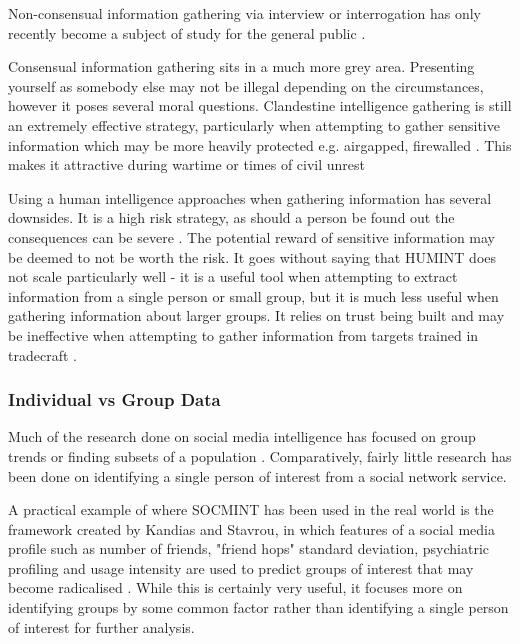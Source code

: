 \documentclass[12pt]{article}
\begin{document}
Non-consensual information gathering via interview or interrogation has only recently become a subject of study for the general public \citep{humintinterrogators}. 

Consensual information gathering sits in a much more grey area. Presenting yourself as somebody else may not be illegal depending on the circumstances, however it poses several moral questions. Clandestine intelligence gathering is still an extremely effective strategy, particularly when attempting to gather sensitive information which may be more heavily protected e.g. airgapped, firewalled \citep{clandestinehumint}. This makes it attractive during wartime or times of civil unrest \citep{humintni}\citep{humintcyberage}

Using a human intelligence approaches when gathering information has several downsides. It is a high risk strategy, as should a person be found out the consequences can be severe \citep{humintni}. The potential reward of sensitive information may be deemed to not be worth the risk. It goes without saying that HUMINT does not scale particularly well - it is a useful tool when attempting to extract information from a single person or small group, but it is much less useful when gathering information about larger groups. It relies on trust being built and may be ineffective when attempting to gather information from targets trained in tradecraft \citep{humintni}\citep{clandestinehumint}\citep{humintcyberage}.

\subsubsection{Individual vs Group Data}
Much of the research done on social media intelligence has focused on group trends or finding subsets of a population \citep{socmintpublicsafety}\citep{socmintoverview}. Comparatively, fairly little research has been done on identifying a single person of interest from a social network service.

A practical example of where SOCMINT has been used in the real world is the framework created by Kandias and Stavrou, in which features of a social media profile such as number of friends, "friend hops" standard deviation, psychiatric profiling and usage intensity are used to predict groups of interest that may become radicalised \citep{behaviourdetection}. While this is certainly very useful, it focuses more on identifying groups by some common factor rather than identifying a single person of interest for further analysis.
\end{document}
